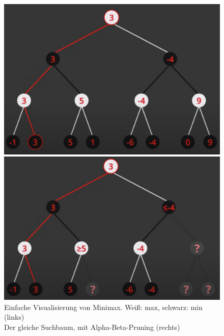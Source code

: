 \documentclass[
  manuscript=article,  %
  layout=publish,  %
  year=2023,
  volume=1,
]{extra/joas}
\begin{document}
\begin{figure}
  \centering
  \begin{minipage}[b]{0.49\textwidth}
    \includegraphics[width=\textwidth]{imgs/MM.png}
  \end{minipage}
  \hfill
  \begin{minipage}[b]{0.49\textwidth}
    \includegraphics[width=\textwidth]{imgs/ABP.png}
  \end{minipage}
  \captionsetup{justification=centering}
  \caption{Einfache Visualisierung von Minimax. Weiß: max, schwarz: min (links) \\ Der gleiche Suchbaum, mit Alpha-Beta-Pruning (rechts)}
  \label{fig:mmabp}
\end{figure}
\end{document}
